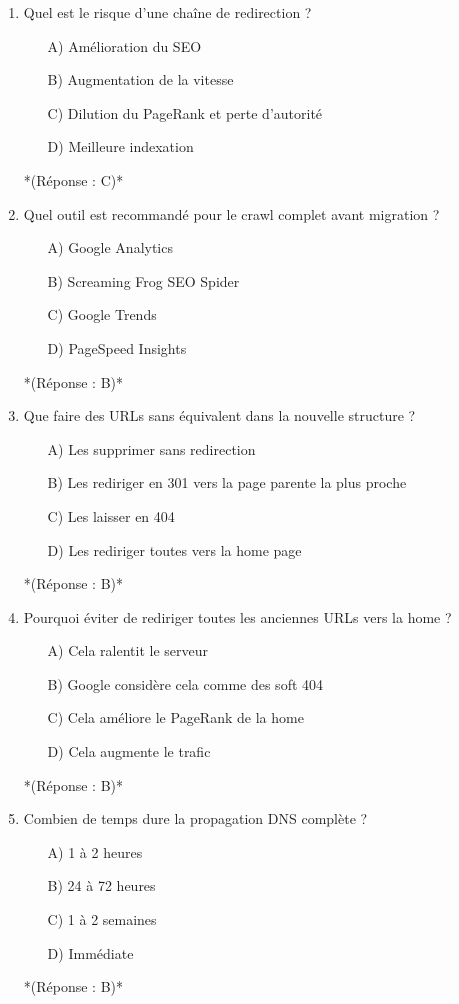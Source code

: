 \documentclass[12pt,a4paper,twoside]{report}
\begin{document}
\begin{enumerate}
\item Quel est le risque d'une chaîne de redirection ?
\begin{itemize}
\item[A)] Amélioration du SEO
\item[B)] Augmentation de la vitesse
\item[C)] Dilution du PageRank et perte d'autorité
\item[D)] Meilleure indexation
\end{itemize}
*(Réponse : C)*

\item Quel outil est recommandé pour le crawl complet avant migration ?
\begin{itemize}
\item[A)] Google Analytics
\item[B)] Screaming Frog SEO Spider
\item[C)] Google Trends
\item[D)] PageSpeed Insights
\end{itemize}
*(Réponse : B)*

\item Que faire des URLs sans équivalent dans la nouvelle structure ?
\begin{itemize}
\item[A)] Les supprimer sans redirection
\item[B)] Les rediriger en 301 vers la page parente la plus proche
\item[C)] Les laisser en 404
\item[D)] Les rediriger toutes vers la home page
\end{itemize}
*(Réponse : B)*

\item Pourquoi éviter de rediriger toutes les anciennes URLs vers la home ?
\begin{itemize}
\item[A)] Cela ralentit le serveur
\item[B)] Google considère cela comme des soft 404
\item[C)] Cela améliore le PageRank de la home
\item[D)] Cela augmente le trafic
\end{itemize}
*(Réponse : B)*

\item Combien de temps dure la propagation DNS complète ?
\begin{itemize}
\item[A)] 1 à 2 heures
\item[B)] 24 à 72 heures
\item[C)] 1 à 2 semaines
\item[D)] Immédiate
\end{itemize}
*(Réponse : B)*


\end{enumerate}
\end{document}
